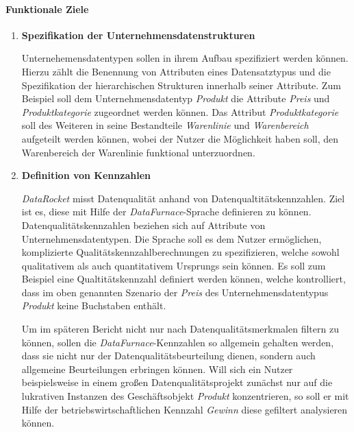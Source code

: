 \documentclass[
  language=german, %
  type=bachelor,%
  ngerman
]{isthesis}
\begin{document}
\begin{content}
  \paragraph{Funktionale Ziele}
    \begin{enumerate}
      \item \textbf{Spezifikation der Unternehmensdatenstrukturen} 

        Unternehemensdatentypen sollen in ihrem Aufbau spezifiziert werden
        können. Hierzu zählt die Benennung von Attributen eines Datensatztypus
        und die Spezifikation der hierarchischen Strukturen innerhalb seiner
        Attribute. Zum Beispiel soll dem Unternehmensdatentyp \textit{Produkt}
        die Attribute \textit{Preis} und \textit{Produktkategorie} zugeordnet
        werden können. Das Attribut \textit{Produktkategorie} soll des Weiteren
        in seine Bestandteile \textit{Warenlinie} und \textit{Warenbereich}
        aufgeteilt werden können, wobei der Nutzer die Möglichkeit haben soll,
        den Warenbereich der Warenlinie funktional unterzuordnen.

      \item \textbf{Definition von Kennzahlen} 

        \textit{DataRocket} misst Datenqualität anhand von
        Datenqualtitätskennzahlen. Ziel ist es, diese mit Hilfe der
        \textit{DataFurnace}-Sprache definieren zu können.
        Datenqualitätskennzahlen beziehen sich auf Attribute von
        Unternehmensdatentypen. Die Sprache soll es dem Nutzer ermöglichen,
        komplizierte Qualitätskennzahlberechnungen zu spezifizieren, welche
        sowohl qualitativem als auch quantitativem Ursprungs sein können. Es
        soll zum Beispiel eine Qualtitätskennzahl definiert werden können,
        welche kontrolliert, dass im oben genannten Szenario der \textit{Preis}
        des Unternehmensdatentypus \textit{Produkt} keine Buchstaben enthält.

        Um im späteren Bericht nicht nur nach Datenqualitätsmerkmalen filtern
        zu können, sollen die \textit{DataFurnace}-Kennzahlen so allgemein
        gehalten werden, dass sie nicht nur der Datenqualitätsbeurteilung
        dienen, sondern auch allgemeine Beurteilungen erbringen können. Will
        sich ein Nutzer beispielsweise in einem großen Datenqualitätsprojekt
        zunächst nur auf die lukrativen Instanzen des Geschäftsobjekt
        \textit{Produkt} konzentrieren, so soll er mit Hilfe der
        betriebswirtschaftlichen Kennzahl \textit{Gewinn} diese gefiltert
        analysieren können.
        

\end{enumerate}
\end{content}
\end{document}
